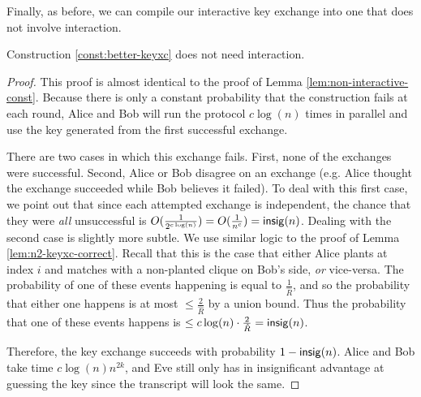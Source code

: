 Finally, as before, we can compile our interactive key exchange into one that does not involve interaction.
\begin{lemma}\label{lem:n2-non-interactive-const}
	Construction \ref{const:better-keyxc} does not need interaction.
\end{lemma}
\begin{proof}
	This proof is almost identical to the proof of Lemma \ref{lem:non-interactive-const}. Because there is only a constant probability that the construction fails at each round, Alice and Bob will run the protocol $c \log(n)$ times in parallel and use the key generated from the first successful exchange.
	
	There are two cases in which this exchange fails. First, none of the exchanges were successful.
	Second, Alice or Bob disagree on an exchange (e.g. Alice thought the exchange succeeded while Bob believes it failed).
	To deal with this first case, we point out that since each attempted exchange is independent, the chance that they were \emph{all} unsuccessful is $O(\frac{1}{2^{c\log(n)}}) = O(\frac{1}{n^c}) = \mathsf{insig}(n)$.
	Dealing with the second case is slightly more subtle. We use similar logic to the proof of Lemma \ref{lem:n2-keyxc-correct}. Recall that this is the case that either Alice plants at index $i$ and matches with a non-planted clique on Bob's side, \emph{or} vice-versa. The probability of one of these events happening is equal to $\frac{1}{\hat R}$, and so the probability that either one happens is at most $\le \frac{2}{\hat R}$ by a union bound. Thus the probability that one of these events happens is $\le c \log(n) \cdot \frac{2}{\hat R} = \mathsf{insig}(n)$.
	
	Therefore, the key exchange succeeds with probability $1 - \mathsf{insig}(n)$. Alice and Bob take time $c \log(n) n^{2k}$, and Eve still only has in insignificant advantage at guessing the key since the transcript will look the same.
\end{proof}

